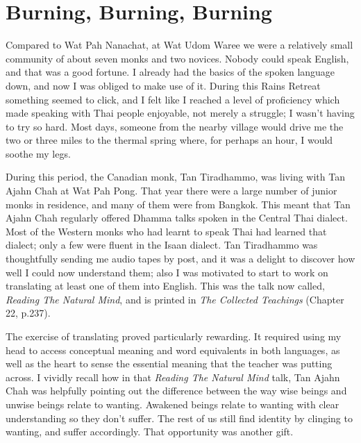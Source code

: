 \chapter{Burning, Burning, Burning}

Compared to Wat Pah Nanachat, at Wat Udom Waree we were a relatively small
community of about seven monks and two novices. Nobody could speak
English, and that was a good fortune. I already had the basics of the
spoken language down, and now I was obliged to make use of it. During
this Rains Retreat something seemed to click, and I felt like I reached
a level of proficiency which made speaking with Thai people enjoyable,
not merely a struggle; I wasn't having to try so hard. Most days,
someone from the nearby village would drive me the two or three miles to
the thermal spring where, for perhaps an hour, I would soothe my legs.

During this period, the Canadian monk, Tan Tiradhammo, was living with
Tan Ajahn Chah at Wat Pah Pong. That year there were a large number of
junior monks in residence, and many of them were from Bangkok. This
meant that Tan Ajahn Chah regularly offered Dhamma talks spoken in the
Central Thai dialect. Most of the Western monks who had learnt to speak
Thai had learned that dialect; only a few were fluent in the Isaan
dialect. Tan Tiradhammo was thoughtfully sending me audio tapes by post,
and it was a delight to discover how well I could now understand them;
also I was motivated to start to work on translating at least one of
them into English. This was the talk now called,
\emph{Reading The Natural Mind}, and is printed in
\emph{The Collected Teachings}\cite{collected} (Chapter 22, p.237).

The exercise of translating proved particularly rewarding. It required
using my head to access conceptual meaning and word equivalents in both
languages, as well as the heart to sense the essential meaning that the
teacher was putting across. I vividly recall how in that \emph{Reading
The Natural Mind} talk, Tan Ajahn Chah was helpfully pointing out the
difference between the way wise beings and unwise beings relate to
wanting. Awakened beings relate to wanting with clear understanding so
they don't suffer. The rest of us still find identity by clinging to
wanting, and suffer accordingly. That opportunity was another gift.


